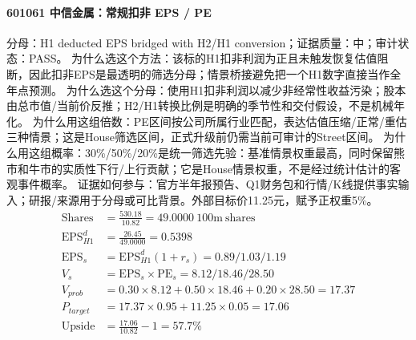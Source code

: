 \paragraph{601061 中信金属：常规扣非 EPS / PE}
分母：H1 deducted EPS bridged with H2/H1 conversion；证据质量：中；审计状态：PASS。
为什么选这个方法：该标的H1扣非利润为正且未触发恢复估值阻断，因此扣非EPS是最透明的筛选分母；情景桥接避免把一个H1数字直接当作全年点预测。
为什么选这个分母：使用H1扣非利润以减少非经常性收益污染；股本由总市值/当前价反推；H2/H1转换比例是明确的季节性和交付假设，不是机械年化。
为什么用这组倍数：PE区间按公司所属行业匹配，表达估值压缩/正常/重估三种情景；这是House筛选区间，正式升级前仍需当前可审计的Street区间。
为什么用这组概率：30\%/50\%/20\%是统一筛选先验：基准情景权重最高，同时保留熊市和牛市的实质性下行/上行贡献；它是House情景权重，不是经过统计估计的客观事件概率。
证据如何参与：官方半年报预告、Q1财务包和行情/K线提供事实输入；研报/来源用于分母或可比背景。外部目标价11.25元，赋予正权重5\%。
\begin{align*}
\mathrm{Shares} &= \frac{530.18}{10.82}=49.0000\ \mathrm{100m\ shares}\\
\mathrm{EPS}_{H1}^d &= \frac{26.45}{49.0000}=0.5398\\
\mathrm{EPS}_s &= \mathrm{EPS}_{H1}^d(1+r_s)=0.89/1.03/1.19\\
V_s &= \mathrm{EPS}_s\times \mathrm{PE}_s=8.12/18.46/28.50\\
V_{prob} &= 0.30\times 8.12+0.50\times 18.46+0.20\times 28.50=17.37\\
P_{target} &= 17.37\times 0.95+11.25\times 0.05=17.06\\
\mathrm{Upside} &= \frac{17.06}{10.82}-1=57.7\%\\
\end{align*}

